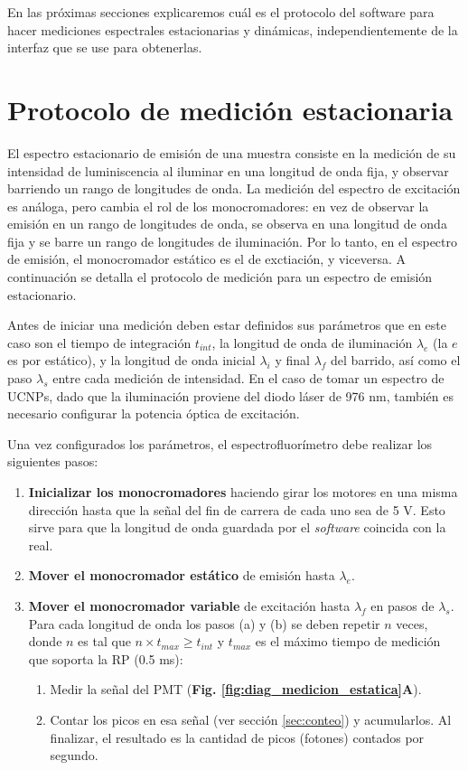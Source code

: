En las próximas secciones explicaremos cuál es el protocolo del software para hacer mediciones espectrales estacionarias y dinámicas, independientemente de la interfaz que se use para obtenerlas.




\section{Protocolo de medición estacionaria}

El espectro estacionario de emisión de una muestra consiste en la medición de su intensidad de luminiscencia al iluminar en una longitud de onda fija, y observar barriendo un rango de longitudes de onda.
La medición del espectro de excitación es análoga, pero cambia el rol de los monocromadores: en vez de observar la emisión en un rango de longitudes de onda, se observa en una longitud de onda fija y se barre un rango de longitudes de iluminación.
Por lo tanto, en el espectro de emisión, el monocromador estático es el de exctiación, y viceversa.
A continuación se detalla el protocolo de medición para un espectro de emisión estacionario.

Antes de iniciar una medición deben estar definidos sus parámetros que en este caso son el tiempo de integración $t_{int}$, la longitud de onda de iluminación $\lambda_e$ (la $e$ es por estático), y la longitud de onda inicial $\lambda_i$ y final $\lambda_f$ del barrido, así como el paso $\lambda_s$ entre cada medición de intensidad.
En el caso de tomar un espectro de UCNPs, dado que la iluminación proviene del diodo láser de 976 nm, también es necesario configurar la potencia óptica de excitación.

Una vez configurados los parámetros, el espectrofluorímetro debe realizar los siguientes pasos:

\begin{enumerate}
     \item \textbf{Inicializar los monocromadores} haciendo girar los motores en una misma dirección hasta que la señal del fin de carrera de cada uno sea de 5 V. Esto sirve para que la longitud de onda guardada por el \textit{software} coincida con la real.
     \item \textbf{Mover el monocromador estático} de emisión hasta $\lambda_e$. 
     \item \textbf{Mover el monocromador variable} de excitación hasta $\lambda_f$ en pasos de $\lambda_s$. Para cada longitud de onda los pasos (a) y (b) se deben repetir  $n$ veces, donde $n$ es tal que $n \times t_{max} \geq t_{int}$ y $t_{max}$ es el máximo tiempo de medición que soporta la RP (0.5 ms):
     \begin{enumerate}
          \item Medir la señal del PMT (\textbf{Fig. \ref{fig:diag_medicion_estatica}A}).
          \item Contar los picos en esa señal (ver sección \ref{sec:conteo}) y acumularlos. Al finalizar, el resultado es la cantidad de picos (fotones) contados por segundo.
     \end{enumerate}
\end{enumerate}

